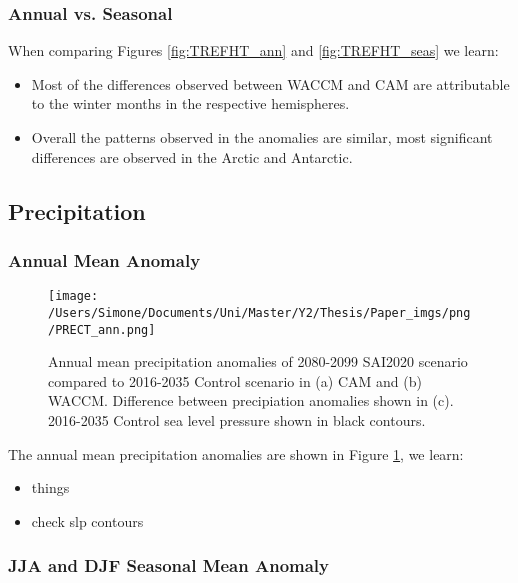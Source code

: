 \subsubsection{Annual vs. Seasonal}
When comparing Figures \ref{fig:TREFHT_ann} and \ref{fig:TREFHT_seas} we learn:

\begin{itemize}
	\item Most of the differences observed between WACCM and CAM are attributable to the winter months in the respective hemispheres. 
	\item Overall the patterns observed in the anomalies are similar, most significant differences are observed in the Arctic and Antarctic. 
\end{itemize}


\subsection{Precipitation}
\subsubsection{Annual Mean Anomaly}

\begin{figure}[H]
	\centering
	\texttt{[image: /Users/Simone/Documents/Uni/Master/Y2/Thesis/Paper\_imgs/png/PRECT\_ann.png]}
	\caption{Annual mean precipitation anomalies of 2080-2099 SAI2020 scenario compared to 2016-2035 Control scenario in (a) CAM and (b) WACCM. Difference between precipiation anomalies shown in (c). 2016-2035 Control sea level pressure shown in black contours.}
	\label{fig:PRECT_ann}
\end{figure}

The annual mean precipitation anomalies are shown in Figure \ref{fig:PRECT_ann}, we learn:

\begin{itemize}
	\item things
\end{itemize}

\begin{itemize}
	\item check slp contours
\end{itemize}

\subsubsection{JJA and DJF Seasonal Mean Anomaly}

